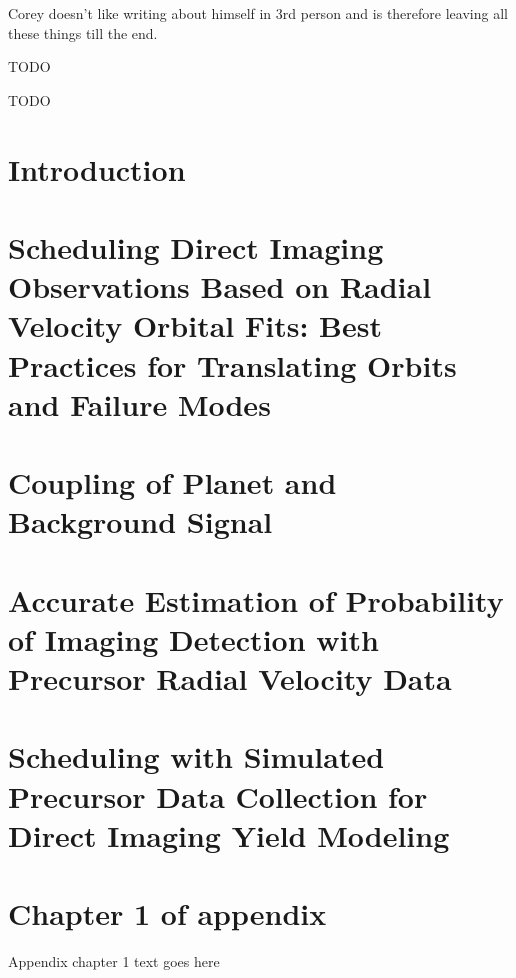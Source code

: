 \documentclass[phd,tocprelim]{cornell}
\begin{document}
\begin{abstract}
\end{abstract}

\begin{biosketch}
Corey doesn't like writing about himself in 3rd person and is therefore leaving
all these things till the end.
\end{biosketch}

\begin{dedication}
TODO
\end{dedication}

\begin{acknowledgements}
TODO
\end{acknowledgements}

\contentspage
\tablelistpage
\figurelistpage

\normalspacing \setcounter{page}{1} 
\pagestyle{cornell} \addtolength{\parskip}{0.5\baselineskip}

\chapter{Introduction}
\label{cha:intro}
% 

\chapter{Scheduling Direct Imaging Observations Based on Radial Velocity Orbital Fits: Best Practices for Translating Orbits and Failure Modes}
\label{cha:first_paper}


\chapter{Coupling of Planet and Background Signal}
\label{cha:coupling}


\chapter{Accurate Estimation of Probability of Imaging Detection with Precursor Radial Velocity Data}
\label{cha:accurate_pdet}


\chapter{Scheduling with Simulated Precursor Data Collection for Direct Imaging Yield Modeling}
\label{cha:sim_and_scheduling}



\appendix
\chapter{Chapter 1 of appendix}
Appendix chapter 1 text goes here


\end{document}

